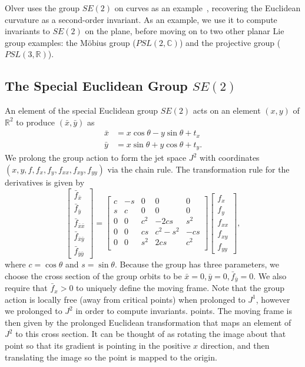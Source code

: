 \documentclass[review,onefignum,onetabnum]{siamonline190516}
\begin{document}
{Olver uses the group $SE(2)$ on curves as an example~\cite{Olver}, recovering the Euclidean curvature as a second-order invariant. As an example, we use it to compute invariants to $SE(2)$ on the plane, before moving on to two other planar Lie group examples: the M\"obius group ($PSL(2,\mathbb{C})$) and the projective group ($PSL(3,\mathbb{R})$). 

\subsection{The Special Euclidean Group $SE(2)$}
An element of the special Euclidean group $SE(2)$ acts on an element $(x, y)$ of $\mathbb{R}^2$ to produce $(\bar{x}, \bar{y})$ as 
\begin{equation*}
  \begin{aligned}
    \bar{x} &= x\cos\theta  - y\sin\theta + t_x \\
    \bar{y} &= x\sin\theta  + y\cos\theta + t_y.
  \end{aligned}
\end{equation*}
We prolong the group action to form the jet space $J^2$ with coordinates $(x,
y, f, f_x, f_y, f_{xx}, f_{xy}, f_{yy})$ via the chain rule. The
transformation rule for the derivatives is given by
\begin{equation}
  \begin{bmatrix}
  \bar f_{\bar x} \\ \bar f_{\bar y} \\ \bar f_{\bar{x}\bar{x}} \\ \bar f_{\bar{x}\bar{y}} \\ \bar f_{\bar{y}\bar{y}}
  \end{bmatrix} = 
  \begin{bmatrix}
 c & -s & 0 & 0 & 0 \\
 s & c & 0 & 0 & 0 \\
0 & 0 & c^2 & -2cs & s^2 \\
0 & 0 & cs & c^2 - s^2 & -cs \\
0 & 0 & s^2 & 2cs & c^2 \\
  \end{bmatrix}
  \begin{bmatrix}
f_x \\ f_y \\ f_{xx} \\ f_{xy} \\ f_{yy} 
  \end{bmatrix},
\label{eqn:SE2}
 \end{equation}
where $c = \cos \theta$ and $s = \sin \theta$. Because the group has three
parameters, we choose the cross section of the group orbits to be $\bar{x}
= 0, \bar{y} = 0, \bar{f}_{\bar{y}} = 0$. We also require that $\bar{f}_{x}
> 0$ to uniquely define the moving frame. Note that the group action is
locally free (away from critical points) when prolonged to $J^1$, however
we prolonged to $J^2$ in order to compute invariants. points. The moving
frame is then given by the prolonged Euclidean transformation that maps an
element of  $J^2$ to this cross section. It can be thought of as rotating
the image about that point so that its gradient is pointing in the positive
$x$ direction, and then translating the image so the point is mapped to the
origin. 

}
\end{document}
